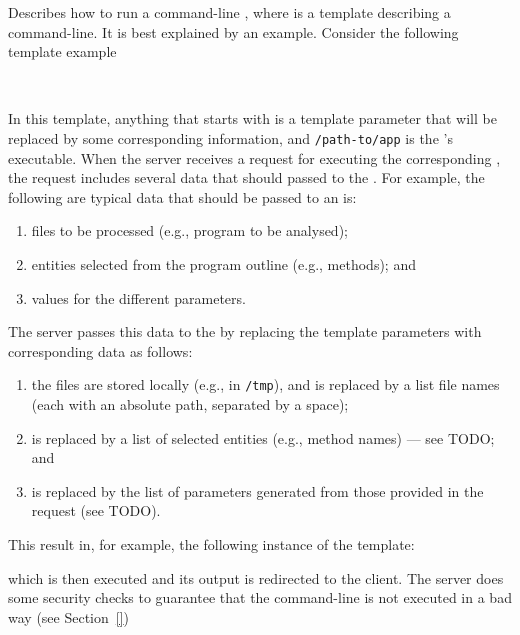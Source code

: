 \noindent
{}
{
%
  Describes how to run a command-line \app, where
   is a template describing a
  command-line. It is best explained by an example. Consider the
  following template example

  \bigskip
  ~~~
  
  \bigskip
  \noindent
  In this template, anything that starts with 
  is a template parameter that will be replaced by some corresponding
  information, and \texttt{/path-to/app} is the \app's executable.
  When the server receives a request for executing the corresponding
  \app, the request includes several data that should passed to the
  \app. For example, the following are typical data that should be
  passed to an \app is:
  \begin{enumerate}
  \item files to be processed (e.g., program to be analysed);
  \item entities selected from the program outline (e.g., methods); and
  \item values for the different parameters.
  \end{enumerate}
  The server passes this data to the \app by replacing the template
  parameters with corresponding data as follows:
  \begin{enumerate}
  \item the files are stored locally (e.g., in \texttt{/tmp}), and
     is replaced by a list file names
    (each with an absolute path, separated by a space);
  \item {} is replaced by a list of
    selected entities (e.g., method names) --- see TODO; and
  \item {} is replaced by the list of
    parameters generated from those provided in the request (see TODO).
  \end{enumerate}
  This result in, for example, the following instance of the template:

  \bigskip
  \hspace{0.7cm}

  \bigskip 
  \noindent
  which is then executed and its output is redirected to the
  client. The server does some security checks to guarantee that the
  command-line is not executed in a bad way (see Section~\ref{})

}
